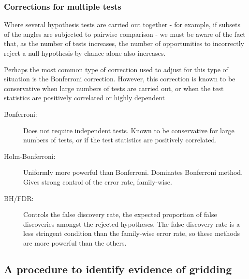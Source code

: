 \documentclass[../../ArchStats.tex]{subfiles}
\begin{document}
\subsubsection{Corrections for multiple tests}

Where several hypothesis tests are carried out together - for example, if subsets of the angles are subjected to pairwise comparison - we must be aware of the fact that, as the number of tests increases, the number of opportunities to incorrectly reject a null hypothesis by chance alone also increases.

Perhaps the most common type of correction used to adjust for this type of situation is the Bonferroni correction. However, this correction is known to be conservative when large numbers of tests are carried out, or when the test statistics are positively correlated or highly dependent 


\begin{description}

\item[Bonferroni: ] Does not require independent tests. Known to be conservative for large numbers of tests, or if the test statistics are positively correlated.

\item[Holm-Bonferroni: ] Uniformly more powerful than Bonferroni. Dominates Bonferroni method. Gives strong control of the error rate, family-wise. \cite{Holm1979}

\item[BH/FDR: ] Controls the false discovery rate, the expected proportion of false discoveries amongst the rejected hypotheses. The false discovery rate is a less stringent condition than the family-wise error rate, so these methods are more powerful than the others. \cite{BH1995}

\end{description}

\subsection{A procedure to identify evidence of gridding}

\end{document}
